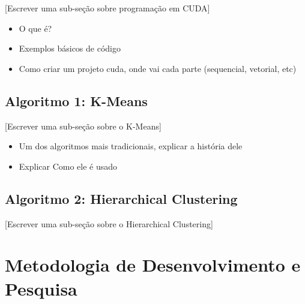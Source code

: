 \documentclass[12pt, %
openright, 
oneside, %
a4paper,    %
brazil]{facom-ufu-abntex2}
\begin{document}
[Escrever uma sub-seção sobre programação em CUDA]

\begin{itemize}
  \item O que é?
  \item Exemplos básicos de código  
  \item Como criar um projeto cuda, onde vai cada parte (sequencial, vetorial, etc)
\end{itemize}




\section{Algoritmo 1: K-Means}

[Escrever uma sub-seção sobre o K-Means]

\begin{itemize}  
  \item Um dos algoritmos mais tradicionais, explicar a história dele
  \item Explicar Como ele é usado
\end{itemize}




\section{Algoritmo 2: Hierarchical Clustering}

[Escrever uma sub-seção sobre o Hierarchical Clustering]












\chapter{Metodologia de Desenvolvimento e Pesquisa}
\end{document}
